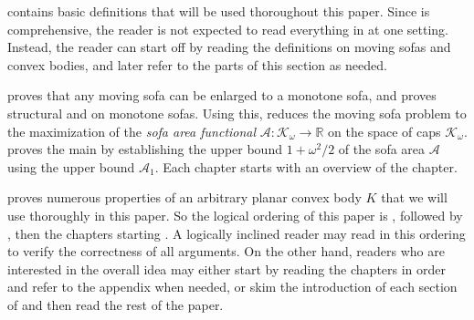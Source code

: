  contains basic definitions that will be used thoroughout this paper. Since  is comprehensive, the reader is not expected to read everything in  at one setting. Instead, the reader can start off by reading the definitions on moving sofas and convex bodies, and later refer to the parts of this section as needed.

 proves  that any moving sofa can be enlarged to a monotone sofa, and proves structural  and  on monotone sofas. Using this,  reduces the moving sofa problem to the maximization of the \emph{sofa area functional} \(\mathcal{A} : \mathcal{K}_\omega \to \mathbb{R}\) on the space of caps \(\mathcal{K}_\omega\).  proves the main  by establishing the upper bound \(1 + \omega^2/2\) of the sofa area \(\mathcal{A}\) using the upper bound \(\mathcal{A}_1\). Each chapter starts with an overview of the chapter.

 proves numerous properties of an arbitrary planar convex body \(K\) that
we will use thoroughly in this paper. So the logical ordering of this paper is
, followed by , then the chapters
starting . A logically inclined reader may read in this ordering to verify
the correctness of all arguments. On the other hand, readers who are interested in the overall idea
may either start by reading the chapters in order and refer to the appendix when needed, or skim the introduction of each section of  and then read the rest of the paper.
